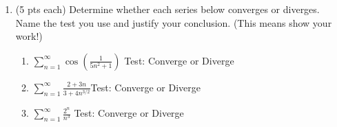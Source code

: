\documentclass[12pt]{article}
\begin{document}
\begin{enumerate}
\newpage

\item (5 pts each) Determine whether each series below converges or diverges. Name the test you use and justify your conclusion. (This means show your work!)
	\begin{enumerate}
	\item $\displaystyle\sum_{n=1}^{\infty} \cos\left(\frac{1}{5n^2+1}\right)$ \hfill Test: \underline{\hspace{2in}}  \hfill Converge or Diverge\\

	\vfill
	\item $\displaystyle\sum_{n=1}^{\infty} \frac{2+3n}{3+4n^{3/2}}$\hfill Test: \underline{\hspace{2in}}  \hfill Converge or Diverge\\
	
	\vfill
\newpage
	
	\item $\displaystyle\sum_{n=1}^{\infty} \frac{2^n}{n^3}$ \hfill Test: \underline{\hspace{2in}}  \hfill Converge or Diverge\\

	\vfill
	

\end{enumerate}
\end{enumerate}
\end{document}
